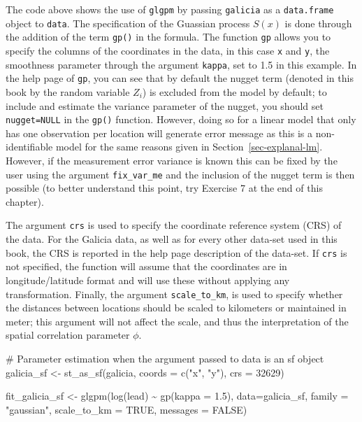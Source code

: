\documentclass[
  letterpaper,
]{krantz}
\newenvironment{Shaded}{\begin{snugshade}}{\end{snugshade}}
\newcommand{\AttributeTok}[1]{\textcolor[rgb]{0.40,0.45,0.13}{#1}}
\newcommand{\CommentTok}[1]{\textcolor[rgb]{0.37,0.37,0.37}{#1}}
\newcommand{\ConstantTok}[1]{\textcolor[rgb]{0.56,0.35,0.01}{#1}}
\newcommand{\DecValTok}[1]{\textcolor[rgb]{0.68,0.00,0.00}{#1}}
\newcommand{\FloatTok}[1]{\textcolor[rgb]{0.68,0.00,0.00}{#1}}
\newcommand{\FunctionTok}[1]{\textcolor[rgb]{0.28,0.35,0.67}{#1}}
\newcommand{\NormalTok}[1]{\textcolor[rgb]{0.00,0.23,0.31}{#1}}
\newcommand{\OtherTok}[1]{\textcolor[rgb]{0.00,0.23,0.31}{#1}}
\newcommand{\SpecialCharTok}[1]{\textcolor[rgb]{0.37,0.37,0.37}{#1}}
\newcommand{\StringTok}[1]{\textcolor[rgb]{0.13,0.47,0.30}{#1}}
\begin{document}
The code above shows the use of \texttt{glgpm} by passing
\texttt{galicia} as a \texttt{data.frame} object to \texttt{data}. The
specification of the Guassian process \(S(x)\) is done through the
addition of the term \texttt{gp()} in the formula. The function
\texttt{gp} allows you to specify the columns of the coordinates in the
data, in this case \texttt{x} and \texttt{y}, the smoothness parameter
through the argument \texttt{kappa}, set to 1.5 in this example. In the
help page of \texttt{gp}, you can see that by default the nugget term
(denoted in this book by the random variable \(Z_i\)) is excluded from
the model by default; to include and estimate the variance parameter of
the nugget, you should set \texttt{nugget=NULL} in the \texttt{gp()}
function. However, doing so for a linear model that only has one
observation per location will generate error message as this is a
non-identifiable model for the same reasons given in
Section~\ref{sec-explanal-lm}. However, if the measurement error
variance is known this can be fixed by the user using the argument
\texttt{fix\_var\_me} and the inclusion of the nugget term is then
possible (to better understand this point, try Exercise 7 at the end of
this chapter).

The argument \texttt{crs} is used to specify the coordinate reference
system (CRS) of the data. For the Galicia data, as well as for every
other data-set used in this book, the CRS is reported in the help page
description of the data-set. If \texttt{crs} is not specified, the
function will assume that the coordinates are in longitude/latitude
format and will use these without applying any transformation. Finally,
the argument \texttt{scale\_to\_km}, is used to specify whether the
distances between locations should be scaled to kilometers or maintained
in meter; this argument will not affect the scale, and thus the
interpretation of the spatial correlation parameter \(\phi\).

\begin{Shaded}
\begin{Highlighting}[]
\CommentTok{\# Parameter estimation when the argument passed to \textasciigrave{}data\textasciigrave{} is an sf object}
\NormalTok{galicia\_sf }\OtherTok{\textless{}{-}} \FunctionTok{st\_as\_sf}\NormalTok{(galicia, }\AttributeTok{coords =} \FunctionTok{c}\NormalTok{(}\StringTok{"x"}\NormalTok{, }\StringTok{"y"}\NormalTok{), }\AttributeTok{crs =} \DecValTok{32629}\NormalTok{)}

\NormalTok{fit\_galicia\_sf }\OtherTok{\textless{}{-}} 
\FunctionTok{glgpm}\NormalTok{(}\FunctionTok{log}\NormalTok{(lead) }\SpecialCharTok{\textasciitilde{}} \FunctionTok{gp}\NormalTok{(}\AttributeTok{kappa =} \FloatTok{1.5}\NormalTok{), }\AttributeTok{data=}\NormalTok{galicia\_sf, }\AttributeTok{family =} \StringTok{"gaussian"}\NormalTok{,}
      \AttributeTok{scale\_to\_km =} \ConstantTok{TRUE}\NormalTok{, }\AttributeTok{messages =} \ConstantTok{FALSE}\NormalTok{)}
\end{Highlighting}
\end{Shaded}
\end{document}
